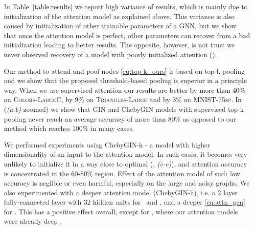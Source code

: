 In Table~\ref{table:results} we report high variance of results, which is mainly due to initialization of the attention model as explained above. This variance is also caused by initialization of other trainable parameters of a GNN, but we show that once the attention model is perfect, other parameters can recover from a bad initialization leading to better results. The opposite, however, is not true: we never observed recovery of a model with poorly initialized attention (\fig{\ref{fig:training_curves_unsup}}).

Our method to attend and pool nodes \eqref{eq:top-k_ours} is based on top-k pooling~\citep{graphunet2018} and we show that the proposed threshold-based pooling is superior in a principle way. When we use supervised attention our results are better by more than 40\% on \textsc{Colors-LargeC}, by 9\%  on \textsc{Triangles-Large} and by 3\% on \textsc{MNIST-75sp}. In \fig{\ref{fig:accuracy_cos_sim}} (\textit{(a,b)}-zoomed) we show that GIN and ChebyGIN models with supervised top-k pooling never reach an average accuracy of more than 80\% as opposed to our method which reaches 100\% in many cases.

We performed experiments using ChebyGIN-h - a model with higher dimensionality of an input to the attention model. In such cases, it becomes very unlikely to initialize it in a way close to optimal (\fig{\ref{fig:accuracy_cos_sim}}, \textit{(c-e)}), and attention accuracy is concentrated in the 60-80\% region. Effect of the attention model of such low accuracy is neglible or even harmful, especially on the large and noisy graphs. We also experimented with a deeper attention model (ChebyGIN-h), i.e. a 2 layer fully-connected layer with 32 hidden units for ~and \mnist, and a deeper \gnn \eqref{eq:attn_gcn} for \tri. This has a positive effect overall, except for \tri, where our attention models were already deep \gnns.

